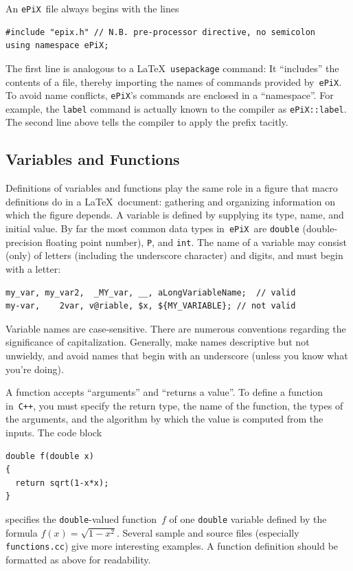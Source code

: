\documentclass[12pt]{report}
\newcommand{\code}[1]{\texttt{#1}}
\newcommand{\filename}[1]{\texttt{#1}}
\newcommand{\ePiX}{\code{ePiX}}
\newcommand{\CXX}{\code{C++}}
\begin{document}
An \ePiX\ file always begins with the lines
\begin{verbatim}
#include "epix.h" // N.B. pre-processor directive, no semicolon
using namespace ePiX;
\end{verbatim}
The first line is analogous to a \LaTeX\ \code{usepackage} command: It
``includes'' the contents of a file, thereby importing the names of
commands provided by~\ePiX.  To avoid name conflicts, \ePiX's commands
are enclosed in a ``namespace''. For example, the \code{label} command
is actually known to the compiler as \code{ePiX::label}. The second
line above tells the compiler to apply the prefix tacitly.


\subsection*{Variables and Functions}

 Definitions of variables and
functions play the same role in a figure that macro definitions do in
a \LaTeX\ document: gathering and organizing information on which the
figure depends. A variable is defined by supplying its type, name, and
initial value. By far the most common data types in~\ePiX\ are
\code{double} (double-precision floating point number), \code{P}, and
\code{int}. The name of a variable may consist (only) of letters
(including the underscore character) and digits, and must begin with a
letter:
\begin{verbatim}
my_var, my_var2,  _MY_var, __, aLongVariableName;  // valid
my-var,    2var, v@riable, $x, ${MY_VARIABLE}; // not valid
\end{verbatim}
Variable names are case-sensitive. There are numerous conventions
regarding the significance of capitalization. Generally, make names
descriptive but not unwieldy, and avoid names that begin with an
underscore (unless you know what you're doing).

A function accepts ``arguments'' and ``returns a value''. To define a
function in~\CXX, you must specify the return type, the name of the
function, the types of the arguments, and the algorithm by which the
value is computed from the inputs. The code block
\begin{verbatim}
double f(double x) 
{ 
  return sqrt(1-x*x); 
}
\end{verbatim}
specifies the \code{double}-valued function~$f$ of one \code{double}
variable defined by the formula $f(x)=\sqrt{1-x^2}$. Several sample
and source files (especially \filename{functions.cc}) give more
interesting examples. A function definition should be formatted as
above for readability.
\end{document}
